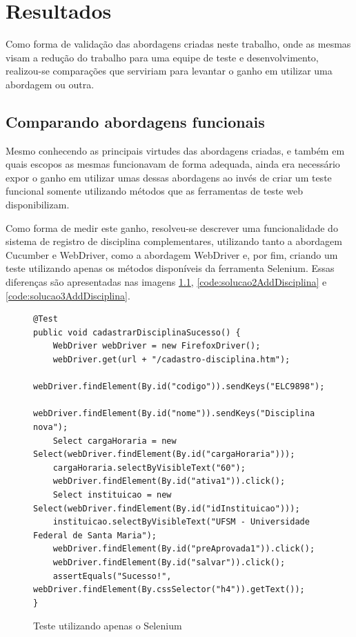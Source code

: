 \documentclass[tg]{mdtufsm}
\begin{document}
\chapter{Resultados}
Como forma de validação das abordagens criadas neste trabalho, onde as mesmas visam a redução do trabalho para uma equipe de teste e desenvolvimento, realizou-se comparações que serviriam para levantar o ganho em utilizar uma abordagem ou outra. 

\section{Comparando abordagens funcionais}
Mesmo conhecendo as principais virtudes das abordagens criadas, e também em quais escopos as mesmas funcionavam de forma adequada, ainda era necessário expor o ganho em utilizar umas dessas abordagens ao invés de criar um teste funcional somente utilizando métodos que as ferramentas de teste web disponibilizam.

Como forma de medir este ganho, resolveu-se descrever uma funcionalidade do sistema de registro de disciplina complementares, utilizando tanto a abordagem Cucumber e WebDriver, como a abordagem WebDriver e, por fim, criando um teste utilizando apenas os métodos disponíveis da ferramenta Selenium. Essas diferenças são apresentadas nas imagens \ref{code:seleniumAddDisciplina}, \ref{code:solucao2AddDisciplina} e \ref{code:solucao3AddDisciplina}.


\begin{figure}[!htt]
	\begin{lstlisting}
@Test
public void cadastrarDisciplinaSucesso() {
    WebDriver webDriver = new FirefoxDriver();
    webDriver.get(url + "/cadastro-disciplina.htm");
    webDriver.findElement(By.id("codigo")).sendKeys("ELC9898");
    webDriver.findElement(By.id("nome")).sendKeys("Disciplina nova");
    Select cargaHoraria = new Select(webDriver.findElement(By.id("cargaHoraria")));
    cargaHoraria.selectByVisibleText("60");
    webDriver.findElement(By.id("ativa1")).click();
    Select instituicao = new Select(webDriver.findElement(By.id("idInstituicao")));
    instituicao.selectByVisibleText("UFSM - Universidade Federal de Santa Maria");
    webDriver.findElement(By.id("preAprovada1")).click();
    webDriver.findElement(By.id("salvar")).click();
    assertEquals("Sucesso!", webDriver.findElement(By.cssSelector("h4")).getText());
}
	\end{lstlisting}
	\caption{Teste utilizando apenas o Selenium}
	\label{code:seleniumAddDisciplina}
\end{figure}
\end{document}
